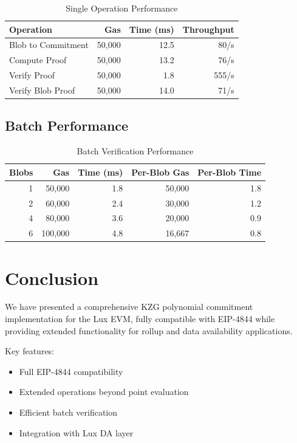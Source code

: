 \documentclass[11pt,a4paper]{article}
\theoremstyle{definition}
\begin{document}
\begin{table}[h]
\centering
\caption{Single Operation Performance}
\begin{tabular}{lrrr}
\toprule
Operation & Gas & Time (ms) & Throughput \\
\midrule
Blob to Commitment & 50,000 & 12.5 & 80/s \\
Compute Proof & 50,000 & 13.2 & 76/s \\
Verify Proof & 50,000 & 1.8 & 555/s \\
Verify Blob Proof & 50,000 & 14.0 & 71/s \\
\bottomrule
\end{tabular}
\end{table}

\subsection{Batch Performance}

\begin{table}[h]
\centering
\caption{Batch Verification Performance}
\begin{tabular}{rrrrr}
\toprule
Blobs & Gas & Time (ms) & Per-Blob Gas & Per-Blob Time \\
\midrule
1 & 50,000 & 1.8 & 50,000 & 1.8 \\
2 & 60,000 & 2.4 & 30,000 & 1.2 \\
4 & 80,000 & 3.6 & 20,000 & 0.9 \\
6 & 100,000 & 4.8 & 16,667 & 0.8 \\
\bottomrule
\end{tabular}
\end{table}

\section{Conclusion}

We have presented a comprehensive KZG polynomial commitment implementation for the Lux EVM, fully compatible with EIP-4844 while providing extended functionality for rollup and data availability applications.

Key features:
\begin{itemize}
    \item Full EIP-4844 compatibility
    \item Extended operations beyond point evaluation
    \item Efficient batch verification
    \item Integration with Lux DA layer
\end{itemize}
\end{document}

